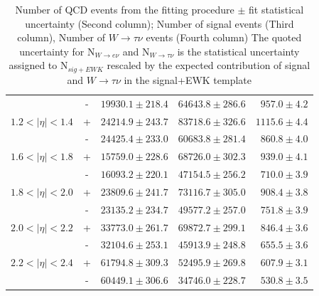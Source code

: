 \begin{table}[htbp]
\begin{center}
\begin{tabular}{lcrrr}
                   &  -& $19930.1 \pm 218.4$ &$64643.8\pm286.6$&$  957.0\pm4.2$ \\ 
$1.2<| \eta |<1.4$ &  +& $24214.9 \pm 243.7$ &$83718.6\pm326.6$&$ 1115.6\pm4.4$ \\
                   &  -& $24425.4 \pm 233.0$ &$60683.8\pm281.4$&$  860.8\pm4.0$ \\ 
$1.6<| \eta |<1.8$ &  +& $15759.0 \pm 228.6$ &$68726.0\pm302.3$&$  939.0\pm4.1$ \\
                   &  -& $16093.2 \pm 220.1$ &$47154.5\pm256.2$&$  710.0\pm3.9$ \\ 
$1.8<| \eta |<2.0$ &  +& $23809.6 \pm 241.7$ &$73116.7\pm305.0$&$  908.4\pm3.8$ \\
                   &  -& $23135.2 \pm 234.7$ &$49577.2\pm257.0$&$  751.8\pm3.9$ \\ 
$2.0<| \eta |<2.2$ &  +& $33773.0 \pm 261.7$ &$69872.7\pm299.1$&$  846.4\pm3.6$ \\
                   &  -& $32104.6 \pm 253.1$ &$45913.9\pm248.8$&$  655.5\pm3.6$ \\ 
$2.2<| \eta |<2.4$ &  +& $61794.8 \pm 309.3$ &$52495.9\pm269.8$&$  607.9\pm3.1$ \\
                   &  -& $60449.1 \pm 306.6$ &$34746.0\pm228.7$&$  530.8\pm3.5$ \\ 
\bottomrule
 \end{tabular}
 \caption{\label{tab:updatedsigyield}
 Number of QCD events from the fitting procedure $\pm$ fit statistical uncertainty (Second column);
   Number of signal events  (Third column), Number of $W\rightarrow \tau \nu$ events (Fourth column)
 The quoted uncertainty for N$_{W\rightarrow e \nu}$ and N$_{W\rightarrow \tau \nu}$
 is the statistical uncertainty assigned to N$_{sig+EWK}$
 rescaled by the expected contribution of signal and $W\rightarrow \tau \nu$ in the signal+EWK template}
 \end{center}
\end{table}

